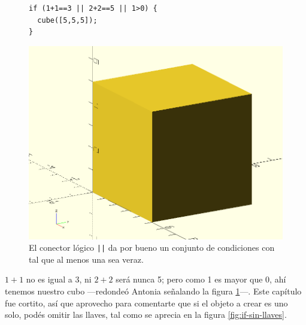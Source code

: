   \begin{figure}[ht]
\begin{minipage}[]{.6\textwidth}%
\begin{lstlisting}
if (1+1==3 || 2+2==5 || 1>0) {
  cube([5,5,5]);
}      
\end{lstlisting}
\end{minipage}
\begin{minipage}[]{.39\textwidth}%
  \centering
  \includegraphics[width=\textwidth]{imagenes/if-4}
\end{minipage}
\caption{El conector lógico \texttt{||} da por bueno un conjunto de
    condiciones con tal que al menos una sea veraz.}
  \label{fig:if-o}
\end{figure}

\guillemotright $1+1$ no es igual a 3, ni $2+2$ será nunca 5; pero
como 1 es mayor que 0, ahí tenemos nuestro cubo ---redondeó Antonia
señalando la figura \ref{fig:if-o}---.  Este capítulo fue cortito, así
que aprovecho para comentarte que si el objeto a crear es uno solo,
podés omitir las llaves, tal como se aprecia en la figura
\ref{fig:if-sin-llaves}.


